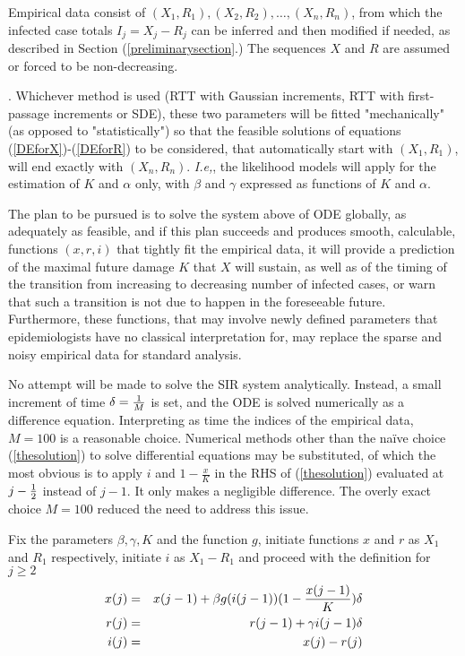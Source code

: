 \documentclass{article}
\begin{document}
\bigskip

Empirical data consist of $(X_1,R_1), (X_2,R_2), \dots, (X_n, R_n)$, from which the infected case totals $I_j=X_j-R_j$ can be inferred and then modified if needed, as described in Section (\ref{preliminarysection}.)
The sequences $X$ and $R$ are assumed or forced to be non-decreasing.

\bigskip

. Whichever method is used (RTT with Gaussian increments, RTT with first-passage increments or SDE), these two parameters will be fitted "mechanically" (as opposed to "statistically") so that the feasible solutions of equations (\ref{DEforX})-(\ref{DEforR}) to be considered, that automatically start with $(X_1, R_1)$, will end exactly with $(X_n, R_n)$. \textit{I.e,}, the likelihood models will apply for the estimation of $K$ and $\alpha$ only, with $\beta$ and $\gamma$ expressed as functions of $K$ and $\alpha$.

\bigskip

The plan to be pursued is to solve the system above of ODE globally, as adequately as feasible, and if this plan succeeds and produces smooth, calculable, functions $(x,r,i)$ that tightly fit the empirical data, it will provide a prediction of the maximal future damage $K$ that $X$ will sustain, as well as of the timing of the transition from increasing to decreasing number of infected cases, or warn that such a transition is not due to happen in the foreseeable future. Furthermore, these functions, that may involve newly defined parameters that epidemiologists have no classical interpretation for, may replace the sparse and noisy empirical data for standard analysis.

No attempt will be made to solve the SIR system analytically. Instead, a small increment of time $\delta={1 \over M}$ is set, and the ODE is solved numerically as a difference equation. Interpreting as time the indices of the empirical data, $M=100$ is a reasonable choice. Numerical methods other than the na\"{i}ve choice (\ref{thesolution}) to solve differential equations may be substituted, of which the most obvious is to apply $i$ and $1 - \frac{x}{K}$ in the RHS of (\ref{thesolution}) evaluated at $j-{1 \over 2}$ instead of $j-1$. It only makes a negligible difference. The overly exact choice $M=100$ reduced the need to address this issue.

\bigskip

Fix the parameters $\beta, \gamma, K$ and the function $g$, initiate functions $x$ and $r$ as $X_1$ and $R_1$ respectively, initiate $i$ as $X_1-R_1$ and proceed with the definition for $j \ge 2$
\begin{eqnarray}
x(j)&=&x(j-1)+\beta g(i(j-1))(1-{{x(j-1)} \over K}) \delta \nonumber \\
r(j)&=&r(j-1)+\gamma i(j-1) \delta \nonumber \\
i(j)&=&x(j)-r(j) \label{thesolution}
\end{eqnarray}
\end{document}
